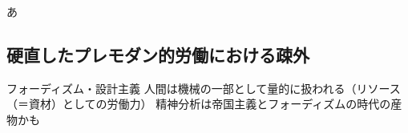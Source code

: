 あ

\subsection{硬直したプレモダン的労働における疎外}\label{ux786cux76f4ux3057ux305fux30d7ux30ecux30e2ux30c0ux30f3ux7684ux52b4ux50cdux306bux304aux3051ux308bux758eux5916}

フォーディズム・設計主義
人間は機械の一部として量的に扱われる（リソース（＝資材）としての労働力）
精神分析は帝国主義とフォーディズムの時代の産物かも
